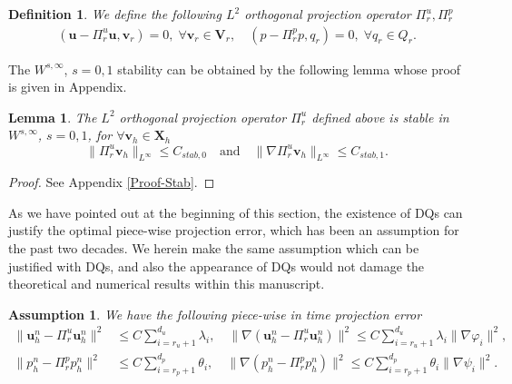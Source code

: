 \documentclass[10pt,twoside,openany,UTF8,CJK]{article}
\newtheorem{Definition}{Definition}[section]
\newtheorem{Lemma}{Lemma}[section]
\newtheorem{Assumption}{Assumption}[section]
\begin{document}
    \begin{Definition}
    	We define the following $L^2$ orthogonal projection operator $\Pi^u_r,\Pi^p_r$
    	$$
    	\begin{aligned}
    		(\boldsymbol{u} - \Pi^u_r\boldsymbol{u}, \boldsymbol{v}_r) = 0,\;\forall \boldsymbol{v}_r\in \boldsymbol{V}_r, \quad (p - \Pi^p_rp, q_r) = 0,\;\forall q_r\in Q_r.
    	\end{aligned}
    	$$
    \end{Definition}
    \indent The $W^{s,\infty}$, $s=0,1$ stability can be obtained by the following lemma whose proof is given in Appendix.
    \begin{Lemma}\label{Lemma-Stab}
    	The $L^2$ orthogonal projection operator $\Pi^u_r$ defined above is stable in $W^{s,\infty}$, $s=0,1$, for $\forall \boldsymbol{v}_h\in \boldsymbol{X}_h$
    	\begin{equation}\label{Stab-L2-Piu}
    		\|\Pi^u_r\boldsymbol{v}_h\|_{L^{\infty}} \leq C_{stab,0} \quad\text{and}\quad \|\nabla\Pi^u_r\boldsymbol{v}_h\|_{L^{\infty}} \leq C_{stab,1}.
    	\end{equation}
    \end{Lemma}
    \begin{proof}
    	See Appendix \ref{Proof-Stab}.
    \end{proof}
    \indent As we have pointed out at the beginning of this section, the existence of DQs can justify the optimal piece-wise projection error\cite{Koc-TimePointwise-SINUM-2021}, which has been an assumption for the past two decades. We herein make the same assumption which can be justified with DQs, and also the appearance of DQs would not damage the theoretical and numerical results within this manuscript.
    \begin{Assumption}\label{Assu}
    	We have the following piece-wise in time projection error
    	\begin{equation}
    	\begin{aligned}		
    		\|\boldsymbol{u}^n_h - \Pi^u_r\boldsymbol{u}^n_h\|^2 &\leq C\sum_{i=r_u+1}^{d_u}\lambda_i, \quad \|\nabla(\boldsymbol{u}^n_h - \Pi^u_r\boldsymbol{u}^n_h)\|^2 \leq C\sum_{i=r_u+1}^{d_u}\lambda_i\|\nabla\varphi_i\|^2, \\
    		\|p^n_h - \Pi^p_rp^n_h\|^2 &\leq C\sum_{i=r_p+1}^{d_p}\theta_i, \quad \|\nabla(p^n_h - \Pi^p_rp^n_h)\|^2 \leq C\sum_{i=r_p+1}^{d_p}\theta_i\|\nabla\psi_i\|^2.
    	\end{aligned}
        \end{equation}
    \end{Assumption}
    
\end{document}
